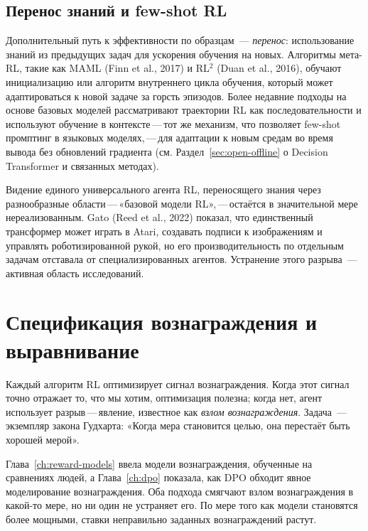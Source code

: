 \subsection{Перенос знаний и few-shot RL}

Дополнительный путь к эффективности по образцам~--- \emph{перенос}:
использование знаний из предыдущих задач для ускорения обучения на новых.
Алгоритмы мета-RL, такие как MAML (Finn et al., 2017) и
RL$^2$ (Duan et al., 2016), обучают инициализацию или алгоритм
внутреннего цикла обучения, который может адаптироваться к новой задаче за горсть
эпизодов. Более недавние подходы на основе базовых моделей рассматривают траектории RL
как последовательности и используют обучение в контексте\,---\,тот же
механизм, что позволяет few-shot промптинг в языковых моделях,\,---\,для
адаптации к новым средам во время вывода без обновлений градиента
(см. Раздел~\ref{sec:open-offline} о Decision Transformer и
связанных методах).

Видение единого универсального агента RL, переносящего знания
через разнообразные области\,---\,«базовой модели RL»,\,---\,остаётся
в значительной мере нереализованным. Gato (Reed et al., 2022) показал, что единственный
трансформер может играть в Atari, создавать подписи к изображениям и управлять роботизированной
рукой, но его производительность по отдельным задачам отставала от специализированных агентов.
Устранение этого разрыва~--- активная область исследований.


\section{Спецификация вознаграждения и выравнивание}
\label{sec:open-alignment}

Каждый алгоритм RL оптимизирует сигнал вознаграждения. Когда этот сигнал
точно отражает то, что мы хотим, оптимизация полезна; когда нет,
агент использует разрыв\,---\,явление, известное как
\emph{взлом вознаграждения}. Задача~--- экземпляр закона Гудхарта: «Когда мера становится целью, она
перестаёт быть хорошей мерой».

Глава~\ref{ch:reward-models} ввела модели вознаграждения, обученные на
сравнениях людей, а Глава~\ref{ch:dpo} показала, как DPO обходит
явное моделирование вознаграждения. Оба подхода смягчают взлом вознаграждения в
какой-то мере, но ни один не устраняет его. По мере того как модели становятся более
мощными, ставки неправильно заданных вознаграждений растут.

